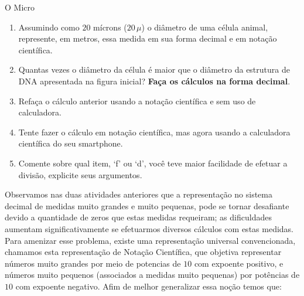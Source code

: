 \begin{task}{O Micro}
\begin{enumerate}
\begin{center}
\begin{tabulary}{\linewidth}[t]{|T|}
\emph{“O diâmetro de uma célula animal mede de {}`10{}` a {}`20{}` mícrons ({}`10{}` a {}`20{}` milionésimos do metro). Elas só são visíveis com microscópios. Essa medida é aproximadamente cinco vezes menor do que a menor partícula visível a olho nu, que teria de 50 a 100 milionésimos do metro. 50 milionésimos do metro é a espessura de meio fio de cabelo \textendash{} de modo aproximado, o limite do que a nossa visão pode alcançar.}” (Fonte: Gestar II - TP4).
\\
\hline
\end{tabulary}
\end{center}
\label{\detokenize{NO103-3:id6}}\label{\detokenize{NO103-3:id14}}

\item {} 
Assumindo como $20$ mícrons ($20\, \mu$) o diâmetro de uma célula animal, represente, em metros, essa medida em sua forma decimal e em notação científica.

\item {} 
Quantas vezes o diâmetro da célula é maior que o diâmetro da estrutura de DNA apresentada na figura inicial? \textbf{Faça os cálculos na forma decimal}.

\item {} 
Refaça o cálculo anterior usando a notação científica e sem uso de calculadora.

\item {} 
Tente fazer o cálculo em notação científica, mas agora usando a calculadora científica do seu smartphone.

\item {} 
Comente sobre qual item, ‘f’ ou ‘d’, você teve maior facilidade de efetuar a divisão, explicite seus argumentos.

\end{enumerate}
\end{task}




\label{\detokenize{NO103-4:organizando-ideias-notacao-cientifica-e-ordem-de-grandeza}}\label{\detokenize{NO103-4::doc}}
Observamos nas duas atividades anteriores que a representação no sistema decimal de medidas muito grandes e muito pequenas, pode se tornar desafiante devido a quantidade de zeros que estas medidas requeiram; as dificuldades aumentam significativamente se efetuarmos diversos cálculos com estas medidas. Para amenizar esse problema, existe uma representação universal convencionada, chamamos esta representação de Notação Científica, que objetiva representar números muito grandes por meio de potencias de $10$ com expoente positivo, e números muito pequenos (associados a medidas muito pequenas) por potências de $10$ com expoente negativo. Afim de melhor generalizar essa noção temos que:

